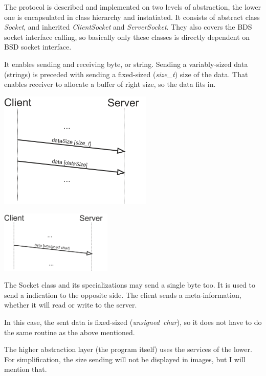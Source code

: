 \documentclass[10pt,a4paper,titlepage]{article}
\begin{document}
\begin{multicols}{2}
The protocol is described and implemented on two levels of abstraction,
the lower one is encapsulated in class hierarchy and instatiated. It
consists of abstract class {\it Socket}, and inherited {\it ClientSocket}
and {\it ServerSocket}. They also covers the BDS socket interface calling,
so basically only these classes is directly dependent on BSD socket interface.

It enables sending and receiving byte, or string. Sending a variably-sized
data (strings) is preceded with sending a fixed-sized ({\it size\_t})
size of the data. That enables receiver to allocate a buffer of right size,
so the data fits in.

\includegraphics[width=0.55\textwidth]{send_data.png}
\end{multicols}


\begin{multicols}{2}
\includegraphics[width=0.4\textwidth]{send_byte.png}

The Socket class and its specializations may send a single byte too.
It is used to send a indication to the opposite side. The client sends
a meta-information, whether it will read or write to the server.

In this case, the sent data is fixed-sized ({\it unsigned~char}),
so it does not have to do the same routine as the above mentioned.
\end{multicols}

The higher abstraction layer (the program itself) uses the services
of the lower. For simplification, the size sending will not
be displayed in images, but I will mention that.
\end{document}
